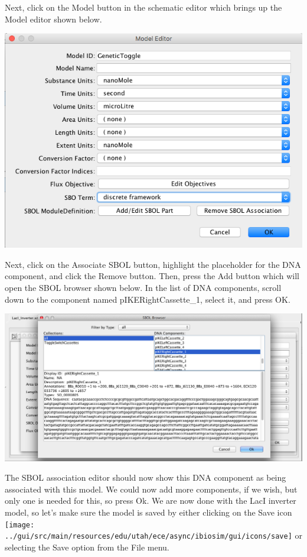\documentclass[titlepage,11pt]{article}
\begin{document}
Next, click on the Model button in the schematic editor which brings up the Model editor shown below.  

\begin{center}
\includegraphics[width=160mm]{screenshots/ModelEditorGT}
\end{center}

Next, click on the Associate SBOL button, highlight the placeholder for the DNA component, and click the Remove button.  Then, press the Add button which will open the SBOL browser shown below.  In the list of DNA components, scroll down to the component named pIKERightCassette\_1, select it, and press OK.

\begin{center}
\includegraphics[width=160mm]{screenshots/SBOLBrowserGT}
\end{center}

The SBOL association editor should now show this DNA component as being associated with this model.  We could now add more components, if we wish, but only one is needed for this, so press Ok.  We are now done with the LacI inverter model, so let's make sure the model is saved by either clicking on the Save icon \texttt{[image: ../gui/src/main/resources/edu/utah/ece/async/ibiosim/gui/icons/save]} or selecting the Save option from the File menu.
\end{document}
